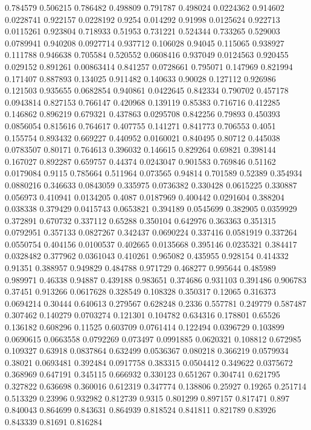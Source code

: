 0.784579 0.506215
0.786482 0.498809
0.791787 0.498024
0.0224362 0.914602
0.0228741 0.922157
0.0228192 0.9254
0.014292 0.91998
0.0125624 0.922713
0.0115261 0.923804
0.718933 0.51953
0.731221 0.524344
0.733265 0.529003
0.0789941 0.940208
0.0927714 0.937712
0.106028 0.94045
0.115065 0.938927
0.111788 0.946638
0.705584 0.520552
0.0608416 0.937049
0.0124563 0.920455
0.029152 0.891261
0.00863414 0.841257
0.0728661 0.795071
0.147969 0.821994
0.171407 0.887893
0.134025 0.911482
0.140633 0.90028
0.127112 0.926986
0.121503 0.935655
0.0682854 0.940861
0.0422645 0.842334
0.790702 0.457178
0.0943814 0.827153
0.766147 0.420968
0.139119 0.85383
0.716716 0.412285
0.146862 0.896219
0.679321 0.437863
0.0295708 0.842256
0.79893 0.450393
0.0856054 0.815616
0.764617 0.407755
0.141271 0.841773
0.706553 0.4051
0.155754 0.893432
0.669227 0.440952
0.0160021 0.840495
0.80712 0.445038
0.0783507 0.80171
0.764613 0.396032
0.146615 0.829264
0.69821 0.398144
0.167027 0.892287
0.659757 0.44374
0.0243047 0.901583
0.769846 0.51162
0.0179084 0.9115
0.785664 0.511964
0.073565 0.94814
0.701589 0.52389
0.354934 0.0880216
0.346633 0.0843059
0.335975 0.0736382
0.330428 0.0615225
0.330887 0.056973
0.410941 0.0134205
0.4087 0.0187969
0.400442 0.0291604
0.388204 0.038338
0.379429 0.0415743
0.0653821 0.394189
0.0545699 0.382905
0.0359929 0.372891
0.670732 0.337112
0.65288 0.350104
0.642976 0.363363
0.351315 0.0792951
0.357133 0.0827267
0.342437 0.0690224
0.337416 0.0581919
0.337264 0.0550754
0.404156 0.0100537
0.402665 0.0135668
0.395146 0.0235321
0.384417 0.0328482
0.377962 0.0361043
0.410261 0.965082
0.435955 0.928154
0.414332 0.91351
0.388957 0.949829
0.484788 0.971729
0.468277 0.995644
0.485989 0.989971
0.46338 0.94887
0.439188 0.983651
0.374686 0.931103
0.391486 0.906783
0.37451 0.913266
0.0617628 0.328549
0.108328 0.350317
0.12065 0.316373
0.0694214 0.30444
0.640613 0.279567
0.628248 0.2336
0.557781 0.249779
0.587487 0.307462
0.140279 0.0703274
0.121301 0.104782
0.634316 0.178801
0.65526 0.136182
0.608296 0.11525
0.603709 0.0761414
0.122494 0.0396729
0.103899 0.0690615
0.0663558 0.0792269
0.073497 0.0991885
0.0620321 0.108812
0.672985 0.109327
0.63918 0.0837864
0.632499 0.0536367
0.080218 0.366219
0.0579934 0.38021
0.0693481 0.392484
0.0917758 0.383315
0.0504412 0.349622
0.0375672 0.368969
0.647191 0.345115
0.666932 0.330123
0.651267 0.304741
0.621795 0.327822
0.636698 0.360016
0.612319 0.347774
0.138806 0.25927
0.19265 0.251714
0.513329 0.23996
0.932982 0.812739
0.9315 0.801299
0.897157 0.817471
0.897 0.840043
0.864699 0.843631
0.864939 0.818524
0.841811 0.821789
0.83926 0.843339
0.81691 0.816284

